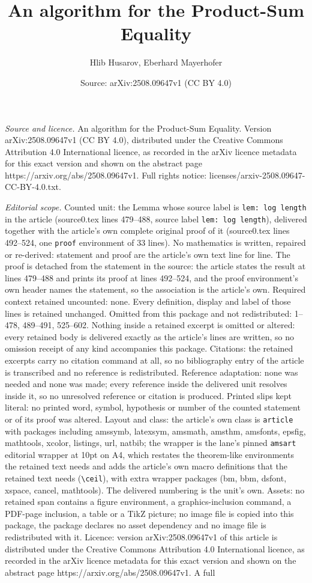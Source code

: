 \documentclass[10pt,a4paper]{amsart}
\title[An algorithm for the Product-Sum Equality]{An algorithm for the Product-Sum Equality}
\author{Hlib Husarov, Eberhard Mayerhofer}
\date{Source: arXiv:2508.09647v1 (CC BY 4.0)}
\begin{document}
\maketitle

\noindent\emph{Source and licence.} An algorithm for the Product-Sum Equality. Version arXiv:2508.09647v1 (CC BY 4.0), distributed under the Creative Commons Attribution 4.0 International licence, as recorded in the arXiv licence metadata for this exact version and shown on the abstract page https://arxiv.org/abs/2508.09647v1. Full rights notice: licenses/arxiv-2508.09647-CC-BY-4.0.txt.\par\smallskip

\noindent\textit{Editorial scope.} Counted unit: the Lemma whose source label is \texttt{lem: log length} in the article (source0.tex lines 479--488, source label \texttt{lem: log length}), delivered together with the article's own complete original proof of it (source0.tex lines 492--524, one \texttt{proof} environment of 33 lines). No mathematics is written, repaired or re-derived: statement and proof are the article's own text line for line. The proof is detached from the statement in the source: the article states the result at lines 479--488 and prints its proof at lines 492--524, and the proof environment's own header names the statement, so the association is the article's own. Required context retained uncounted: none. Every definition, display and label of those lines is retained unchanged. Omitted from this package and not redistributed: 1--478, 489--491, 525--602. Nothing inside a retained excerpt is omitted or altered: every retained body is delivered exactly as the article's lines are written, so no omission receipt of any kind accompanies this package. Citations: the retained excerpts carry no citation command at all, so no bibliography entry of the article is transcribed and no reference is redistributed. Reference adaptation: none was needed and none was made; every reference inside the delivered unit resolves inside it, so no unresolved reference or citation is produced. Printed slips kept literal: no printed word, symbol, hypothesis or number of the counted statement or of its proof was altered. Layout and class: the article's own class is \texttt{article} with packages including amssymb, latexsym, amsmath, amsthm, amsfonts, epsfig, mathtools, xcolor, listings, url, natbib; the wrapper is the lane's pinned \texttt{amsart} editorial wrapper at 10pt on A4, which restates the theorem-like environments the retained text needs and adds the article's own macro definitions that the retained text needs (\texttt{\textbackslash ceil}), with extra wrapper packages (bm, bbm, dsfont, xspace, cancel, mathtools). The delivered numbering is the unit's own. Assets: no retained span contains a figure environment, a graphics-inclusion command, a PDF-page inclusion, a table or a TikZ picture; no image file is copied into this package, the package declares no asset dependency and no image file is redistributed with it. Licence: version arXiv:2508.09647v1 of this article is distributed under the Creative Commons Attribution 4.0 International licence, as recorded in the arXiv licence metadata for this exact version and shown on the abstract page https://arxiv.org/abs/2508.09647v1. A full 
\end{document}
